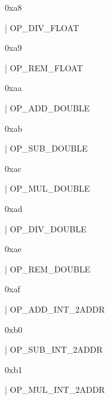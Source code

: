 \documentclass[11pt]{article}
\begin{document}
\begin{ocamldoccomment}
0xa8
\end{ocamldoccomment}
\begin{ocamldoccode}
  | OP_DIV_FLOAT
\end{ocamldoccode}
\begin{ocamldoccomment}
0xa9
\end{ocamldoccomment}
\begin{ocamldoccode}
  | OP_REM_FLOAT
\end{ocamldoccode}
\begin{ocamldoccomment}
0xaa
\end{ocamldoccomment}
\begin{ocamldoccode}
  | OP_ADD_DOUBLE
\end{ocamldoccode}
\begin{ocamldoccomment}
0xab
\end{ocamldoccomment}
\begin{ocamldoccode}
  | OP_SUB_DOUBLE
\end{ocamldoccode}
\begin{ocamldoccomment}
0xac
\end{ocamldoccomment}
\begin{ocamldoccode}
  | OP_MUL_DOUBLE
\end{ocamldoccode}
\begin{ocamldoccomment}
0xad
\end{ocamldoccomment}
\begin{ocamldoccode}
  | OP_DIV_DOUBLE
\end{ocamldoccode}
\begin{ocamldoccomment}
0xae
\end{ocamldoccomment}
\begin{ocamldoccode}
  | OP_REM_DOUBLE
\end{ocamldoccode}
\begin{ocamldoccomment}
0xaf
\end{ocamldoccomment}
\begin{ocamldoccode}
  | OP_ADD_INT_2ADDR
\end{ocamldoccode}
\begin{ocamldoccomment}
0xb0
\end{ocamldoccomment}
\begin{ocamldoccode}
  | OP_SUB_INT_2ADDR
\end{ocamldoccode}
\begin{ocamldoccomment}
0xb1
\end{ocamldoccomment}
\begin{ocamldoccode}
  | OP_MUL_INT_2ADDR
\end{ocamldoccode}
\end{document}
